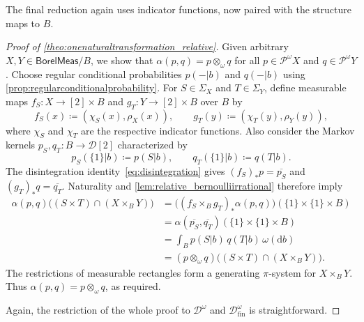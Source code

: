 \documentclass[11pt,a4paper]{scrartcl}
\newcommand{\borelmeas}{\mathsf{BorelMeas}}
\newcommand{\dx}{\mathrm{d}}
\newcommand{\finiteset}[1]{[#1]}	%
\newcommand{\two}{\finiteset{2}}		%
\newcommand{\dist}{\mathcal{D}}
\newcommand{\distfin}{\mathcal{D}_{\mathrm{fin}}}
\newcommand{\giry}{\mathcal{P}}
\theoremstyle{definition}
\begin{document}
The final reduction again uses indicator functions, now paired with the structure maps to $B$.

\begin{proof}[Proof of \cref{theo:onenaturaltransformation_relative}]
	Given arbitrary $X,Y \in \borelmeas/B$,
	we show that $\alpha(p,q) = p \otimes_\omega q$ for all $p \in \giry^\omega X$ and $q \in \giry^\omega Y$.
	Choose regular conditional probabilities $p(-|b)$ and $q(-|b)$ using \cref{prop:regularconditionalprobability}.
	For $S \in \Sigma_X$ and $T \in \Sigma_Y$, define measurable maps $f_S : X \to \two \times B$ and $g_T : Y \to \two \times B$ over $B$ by
	\[
		f_S(x) \coloneq (\chi_S(x),\rho_X(x)),
		\qquad
		g_T(y) \coloneq (\chi_T(y),\rho_Y(y)),
	\]
	where $\chi_S$ and $\chi_T$ are the respective indicator functions.
	Also consider the Markov kernels $p_S,q_T : B \to \dist\two$ characterized by
	\[
		p_S(\{1\}|b) \coloneq p(S|b), \qquad q_T(\{1\}|b) \coloneq q(T|b).
	\]
	The disintegration identity~\eqref{eq:disintegration} gives
	$(f_S)_\ast p = \overline{p_S}$ and $(g_T)_\ast q = \overline{q_T}$.
	Naturality and \cref{lem:relative_bernoulliirrational} therefore imply
	\begin{align*}
		\alpha(p,q)\bigl((S \times T) \cap (X \times_B Y)\bigr)
		&= \bigl((f_S \times_B g_T)_\ast\alpha(p,q)\bigr)(\{1\} \times \{1\} \times B) \\[2pt]
		&= \alpha(\overline{p_S},\overline{q_T})(\{1\} \times \{1\} \times B) \\[2pt]
		&= \int_B p(S|b) \, q(T|b) \, \omega(\dx b) \\[2pt]
		&= (p \otimes_\omega q)\bigl((S \times T) \cap (X \times_B Y)\bigr).
	\end{align*}
	The restrictions of measurable rectangles form a generating $\pi$-system for $X \times_B Y$.
	Thus $\alpha(p,q) = p \otimes_\omega q$, as required.

	Again, the restriction of the whole proof to $\dist^\omega$ and $\distfin^\omega$ is straightforward.
\end{proof}





\printbibliography[heading=bibintoc]
\end{document}

